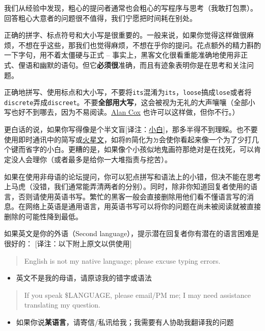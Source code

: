 \documentclass[titlepage]{article}
\begin{document}
我们从经验中发现，粗心的提问者通常也会粗心的写程序与思考（我敢打包票）。回答粗心大意者的问题很不值得，我们宁愿把时间耗在别处。

正确的拼字、标点符号和大小写是很重要的。一般来说，如果你觉得这样做很麻烦，不想在乎这些，那我们也觉得麻烦，不想在乎你的提问。花点额外的精力斟酌一下字句，用不着太僵硬与正式
--
事实上，黑客文化很看重能准确地使用非正式、俚语和幽默的语句。但它\textbf{必须很}准确，而且有迹象表明你是在思考和关注问题。

正确地拼写、使用标点和大小写，不要将\texttt{its}混淆为\texttt{it\textquotesingle{}s}，\texttt{loose}搞成\texttt{lose}或者将\texttt{discrete}弄成\texttt{discreet}。不要\textbf{全部用大写}，这会被视为无礼的大声嚷嚷（全部小写也好不到哪去，因为不易阅读。\href{http://en.wikipedia.org/wiki/Alan_Cox}{Alan
Cox} 也许可以这样做，但你不行。）

更白话的说，如果你写得像是个半文盲{[}译注：\href{http://zh.wikipedia.org/zh-tw/小白}{小白}{]}，那多半得不到理睬。也不要使用即时通讯中的简写或\href{http://zh.wikipedia.org/zh-tw/火星文}{火星文}，如将\texttt{的}简化为\texttt{ㄉ}会使你看起来像一个为了少打几个键而省字的小白。更糟的是，如果像个小孩似地鬼画符那绝对是在找死，可以肯定没人会理你（或者最多是给你一大堆指责与挖苦）。

如果在使用非母语的论坛提问，你可以犯点拼写和语法上的小错，但决不能在思考上马虎（没错，我们通常能弄清两者的分别）。同时，除非你知道回复者使用的语言，否则请使用英语书写。繁忙的黑客一般会直接删除用他们看不懂语言写的消息。在网络上英语是通用语言，用英语书写可以将你的问题在尚未被阅读就被直接删除的可能性降到最低。

如果英文是你的外语（Second
language），提示潜在回复者你有潜在的语言困难是很好的：
{[}译注：以下附上原文以供使用{]}

\begin{quote}
English is not my native language; please excuse typing errors.
\end{quote}

\begin{itemize}

\item
  英文不是我的母语，请原谅我的错字或语法
\end{itemize}

\begin{quote}
If you speak \$LANGUAGE, please email/PM me; I may need assistance
translating my question.
\end{quote}

\begin{itemize}

\item
  如果你说\textbf{某语言}，请寄信/私讯给我；我需要有人协助我翻译我的问题
\end{itemize}
\end{document}
